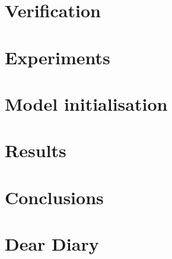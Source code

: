 \documentclass[11pt]{book}
\begin{document}
\chapter{Verification}


\chapter{Experiments}


\chapter{Model initialisation}


\chapter{Results}


\chapter{Conclusions}


 


\appendix
\chapter{Dear Diary}

\end{document}
